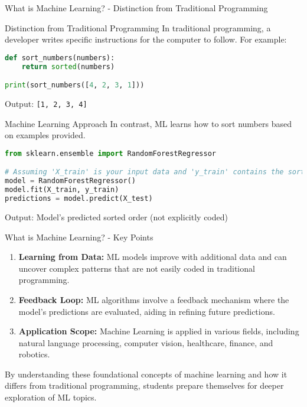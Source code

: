\documentclass[aspectratio=169]{beamer}
\begin{document}
\begin{frame}[fragile]{What is Machine Learning? - Distinction from Traditional Programming}
    \begin{block}{Distinction from Traditional Programming}
        In traditional programming, a developer writes specific instructions for the computer to follow. For example:
    \end{block}
    
    \begin{lstlisting}[language=Python]
def sort_numbers(numbers):
    return sorted(numbers)

print(sort_numbers([4, 2, 3, 1]))
    \end{lstlisting}

    Output: \texttt{[1, 2, 3, 4]}
    
    \begin{block}{Machine Learning Approach}
        In contrast, ML learns how to sort numbers based on examples provided.
    \end{block}
    
    \begin{lstlisting}[language=Python]
from sklearn.ensemble import RandomForestRegressor

# Assuming 'X_train' is your input data and 'y_train' contains the sorted results
model = RandomForestRegressor()
model.fit(X_train, y_train)
predictions = model.predict(X_test)
    \end{lstlisting}
    Output: Model's predicted sorted order (not explicitly coded)
\end{frame}

\begin{frame}[fragile]{What is Machine Learning? - Key Points}
    \begin{enumerate}
        \item \textbf{Learning from Data:} ML models improve with additional data and can uncover complex patterns that are not easily coded in traditional programming.
        \item \textbf{Feedback Loop:} ML algorithms involve a feedback mechanism where the model’s predictions are evaluated, aiding in refining future predictions.
        \item \textbf{Application Scope:} Machine Learning is applied in various fields, including natural language processing, computer vision, healthcare, finance, and robotics.
    \end{enumerate}

    By understanding these foundational concepts of machine learning and how it differs from traditional programming, students prepare themselves for deeper exploration of ML topics.
\end{frame}
\end{document}
